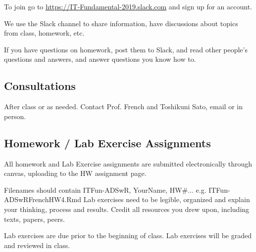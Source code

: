 \documentclass[11pt]{article} %
\begin{document}
  To join go to \href{"https://IT-Fundamental-2019.slack.com''}{https://IT-Fundamental-2019.slack.com} and sign up for an account. 
  
  We use the Slack channel to share information, have discussions about topics from class, homework, etc.  
  
  If you have questions on homework, post them to Slack, and read other people's questions and answers, and answer questions you know how to. 

\subsection{Consultations}
After class or as needed. Contact Prof. French and Toshikuni Sato, email or in person. 

\subsection{Homework / Lab Exercise Assignments}
All homework and Lab Exercise assignments are submitted electronically through canvas, uploading to the HW assignment page.  

Filenames should contain ITFun-ADSwR, YourName, HW\#... e.g. ITFun-ADSwRFrenchHW4.Rmd
Lab exercises need to be legible, organized and explain your thinking, process and results.
Credit all resources you drew upon, including texts, papers, peers.

Lab exercises are due prior to the beginning of class.
Lab exercises will be graded and reviewed in class.
\end{document}
